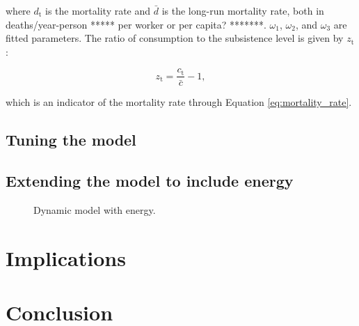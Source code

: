 \documentclass[letterpaper,12pt]{article}
\begin{document}
\noindent where $d_\mathrm{t}$ is the mortality rate and $\bar d$ is the long-run mortality rate, both in deaths/year-person ***** per worker or per capita? *******. $\omega_\mathrm{1}$, $\omega_\mathrm{2}$, and $\omega_\mathrm{3}$ are fitted parameters. The ratio of consumption to the subsistence level is given by $z_\mathrm{t}$:

\begin{equation} \label{eq:z}
	z_\mathrm{t} = \frac{c_\mathrm{t}}{\bar c} - 1, 
\end{equation}

\noindent which is an indicator of the mortality rate through Equation \ref{eq:mortality_rate}.

\subsection{Tuning the model}

\subsection{Extending the model to include energy}

\begin{figure} 
  \caption{Dynamic model with energy.}
  \label{fig:ModelWithEnergy}
\end{figure}

\section{Implications}

\section{Conclusion}




\end{document}
